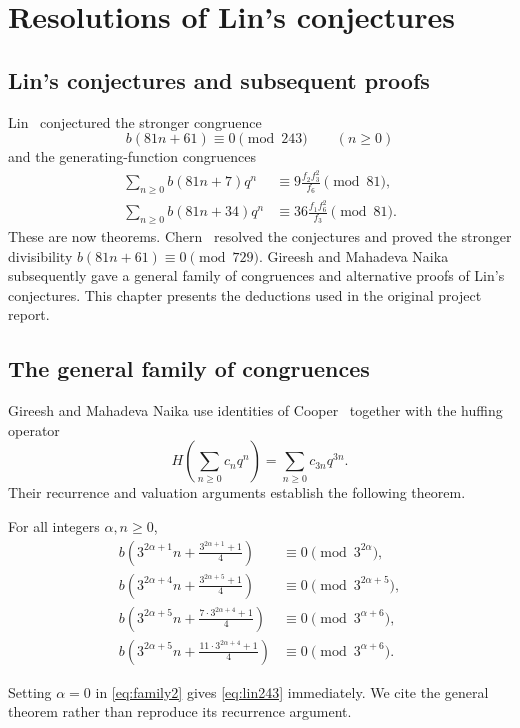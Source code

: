 \chapter{Resolutions of Lin's conjectures}\label{ch:lin}
\section{Lin's conjectures and subsequent proofs}
Lin~\cite{Lin2017} conjectured the stronger congruence
\begin{equation}\label{eq:lin243}
 b(81n+61)\equiv0\pmod{243}\qquad(n\ge0)
\end{equation}
and the generating-function congruences
\begin{align}
 \sum_{n\ge0}b(81n+7)q^n
 &\equiv9\frac{f_2f_3^2}{f_6}\pmod{81},\label{eq:lin81a}\\
 \sum_{n\ge0}b(81n+34)q^n
 &\equiv36\frac{f_1f_6^2}{f_3}\pmod{81}.\label{eq:lin81b}
\end{align}
These are now theorems. Chern~\cite{chern} resolved the conjectures and
proved the stronger divisibility $b(81n+61)\equiv0\pmod{729}$.
Gireesh and Mahadeva Naika~\cite{gireesh} subsequently gave a general family
of congruences and alternative proofs of Lin's conjectures. This chapter
presents the deductions used in the original project report.

\section{The general family of congruences}
Gireesh and Mahadeva Naika use identities of Cooper~\cite{cooper} together
with the huffing operator
\[
 H\left(\sum_{n\ge0}c_nq^n\right)=\sum_{n\ge0}c_{3n}q^{3n}.
\]
Their recurrence and valuation arguments establish the following theorem.
\begin{theorem}
\label{thm:general-cubic}
For all integers $\alpha,n\ge0$,
\begin{align}
 b\left(3^{2\alpha+1}n+\frac{3^{2\alpha+1}+1}{4}\right)
 &\equiv0\pmod{3^{2\alpha}},\label{eq:family1}\\
 b\left(3^{2\alpha+4}n+\frac{3^{2\alpha+5}+1}{4}\right)
 &\equiv0\pmod{3^{2\alpha+5}},\label{eq:family2}\\
 b\left(3^{2\alpha+5}n+\frac{7\cdot3^{2\alpha+4}+1}{4}\right)
 &\equiv0\pmod{3^{\alpha+6}},\label{eq:family3}\\
 b\left(3^{2\alpha+5}n+\frac{11\cdot3^{2\alpha+4}+1}{4}\right)
 &\equiv0\pmod{3^{\alpha+6}}.\label{eq:family4}
\end{align}
\end{theorem}
Setting $\alpha=0$ in \eqref{eq:family2} gives \eqref{eq:lin243} immediately.
We cite the general theorem rather than reproduce its recurrence argument.

